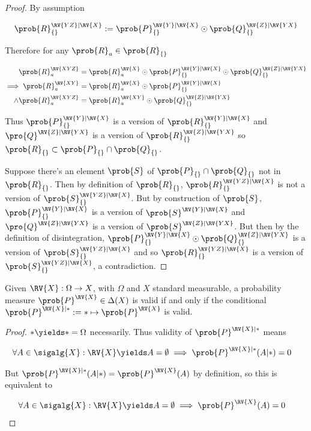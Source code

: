 \begin{proof}
By assumption

\begin{align}
    \prob{R}_{\{\}}^{\RV{YZ}|\RV{X}}:=\prob{P}_{\{\}}^{\RV{Y}|\RV{X}}\odot \prob{Q}_{\{\}}^{\RV{Z}|\RV{YX}}
\end{align}

Therefore for any $\prob{R}_a\in\prob{R}_{\{\}}$

\begin{align}
    \prob{R}_{a}^{\RV{XYZ}} &= \prob{R}_a^{\RV{X}}\odot \prob{P}_{\{\}}^{\RV{Y}|\RV{X}}\odot \prob{Q}_{\{\}}^{\RV{Z}|\RV{YX}}\\
    \implies \prob{R}_{a}^{\RV{XY}} &= \prob{R}_a^{\RV{X}}\odot \prob{P}_{\{\}}^{\RV{Y}|\RV{X}}\\
    \land \prob{R}_{a}^{\RV{XYZ}} &= \prob{R}_{a}^{\RV{XY}}\odot \prob{Q}_{\{\}}^{\RV{Z}|\RV{YX}}
\end{align}

Thus $\prob{P}_{\{\}}^{\RV{Y}|\RV{X}}$ is a version of $\prob{R}_{\{\}}^{\RV{Y}|\RV{X}}$ and $\pro{Q}^{\RV{Z}|\RV{YX}}$ is a version of $\prob{R}_{\{\}}^{\RV{Z}|\RV{YX}}$ so $\prob{R}_{\{\}}\subset \prob{P}_{\{\}}\cap\prob{Q}_{\{\}}$.

Suppose there's an element $\prob{S}$ of $\prob{P}_{\{\}}\cap\prob{Q}_{\{\}}$ not in $\prob{R}_{\{\}}$. Then by definition of $\prob{R}_{\{\}}$, $\prob{R}_{\{\}}^{\RV{YZ}|\RV{X}}$ is not a version of $\prob{S}_{\{\}}^{\RV{YZ}|\RV{X}}$. But by construction of $\prob{S}$, $\prob{P}_{\{\}}^{\RV{Y}|\RV{X}}$  is a version of $\prob{S}^{\RV{Y}|\RV{X}}$ and  $\pro{Q}^{\RV{Z}|\RV{YX}}$ is a version of $\prob{S}^{\RV{Z}|\RV{YX}}$. But then by the definition of disintegration, $\prob{P}_{\{\}}^{\RV{Y}|\RV{X}} \odot \prob{Q}_{\{\}}^{\RV{Z}|\RV{YX}}$ is a version of $\prob{S}_{\{\}}^{\RV{YZ}|\RV{X}}$ and so $\prob{R}_{\{\}}^{\RV{YZ}|\RV{X}}$ is a version of $\prob{S}_{\{\}}^{\RV{YZ}|\RV{X}}$, a contradiction.
\end{proof}


\begin{lemma}\label{th:valid_agree}
Given $\RV{X}:\Omega\to X$, with $\Omega$ and $X$ standard measurable, a probability measure $\prob{P}^{\RV{X}}\in \Delta(X)$ is valid if and only if the conditional $\prob{P}^{\RV{X}|*}:=*\mapsto \prob{P}^{\RV{X}}$ is valid.
\end{lemma}

\begin{proof}
$*\yields *=\Omega$ necessarily. Thus validity of $\prob{P}^{\RV{X}|*}$ means 

\begin{align}
    \forall A\in \sigalg{X}: \RV{X}\yields A=\emptyset \implies \prob{P}^{\RV{X}|*}(A|*)&=0
\end{align}

But $\prob{P}^{\RV{X}|*}(A|*)=\prob{P}^{\RV{X}}(A)$ by definition, so this is equivalent to

\begin{align}
    \forall A\in \sigalg{X}: \RV{X}\yields A=\emptyset \implies \prob{P}^{\RV{X}}(A)&=0
\end{align}
\end{proof}



